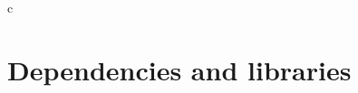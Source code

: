 c\chapter{Dependencies and libraries}%
\label{app:dependances}

\begin{center}
    \begin{verbatim}
    \end{verbatim}
\end{center}